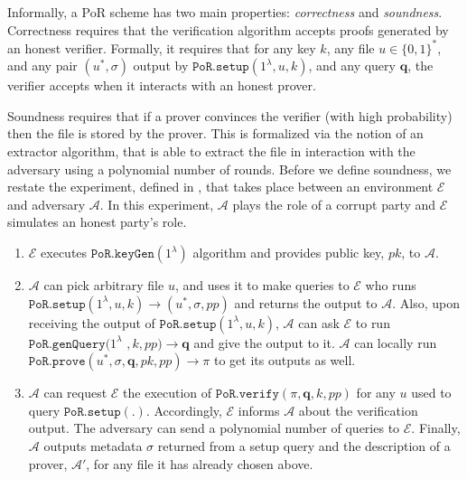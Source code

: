 Informally, a PoR scheme has two main properties: \emph{correctness} and \emph{soundness}. Correctness requires that the verification algorithm accepts  proofs generated by an honest verifier. Formally, it requires that for any key $k$, any file $u\in\{0,1\}^{\scriptscriptstyle *}$, and any  pair $(u^{*},\sigma)$ output by $\mathtt{PoR.setup}(1^{\scriptscriptstyle\lambda}, u,k)$, and any query $\bm{q}$, the verifier  accepts when it interacts with an honest prover.

 Soundness requires that if a prover convinces the verifier (with high probability) then the file is stored by the prover. This is formalized via the notion of an extractor algorithm, that is able to extract the file in interaction with the adversary using a polynomial number of  rounds. Before we define  soundness, we restate the  experiment, defined in \cite{DBLP:conf/asiacrypt/ShachamW08}, that takes place between an environment $\mathcal{E}$ and  adversary $\mathcal{A}$. In this experiment, $\mathcal{A}$ plays the role of a corrupt party and $\mathcal{E}$ simulates an honest party's role. 


\begin{enumerate}
\item $\mathcal{E}$ executes $\mathtt{PoR.keyGen}(1^{\scriptscriptstyle\lambda})$ algorithm and provides public key, $pk$, to $\mathcal{A}$.   
\item $\mathcal{A}$ can pick  arbitrary file $u$, and  uses it to make queries to  $\mathcal{E}$ who runs  $\mathtt{PoR.setup}(1^{\scriptscriptstyle\lambda}, u,k)\rightarrow (u^{\scriptscriptstyle *}, \sigma, { pp})$   and returns the output to $\mathcal{A}$. Also, upon receiving the output of $\mathtt{PoR.setup}(1^{\scriptscriptstyle\lambda}, u,k)$, $\mathcal{A}$ can ask $\mathcal{E}$  to run   $\mathtt{PoR.genQuery}(1^{\scriptscriptstyle\lambda}$ $, k,{ pp})\rightarrow \bm{q}$ and give the output to it. $\mathcal{A}$ can locally run $\mathtt{PoR.prove}(u^{\scriptscriptstyle *}, \sigma, \bm{q},pk,{ pp})\rightarrow \pi$ to get its outputs as well. 
\item $\mathcal{A}$ can request $\mathcal{E}$ the execution of $\mathtt{PoR.verify}(\pi,\bm{q},k,{ pp})$ for any $u$ used to query $\mathtt{PoR.setup}(.)$. Accordingly, $\mathcal{E}$ informs  $\mathcal{A}$ about the verification output. The adversary can send a polynomial number of queries to $\mathcal{E}$. Finally, $\mathcal{A}$ outputs metadata $\sigma$ returned from a setup query and the description of a prover, $\mathcal{A}'$, for any file it has already chosen above. 
\end{enumerate}

